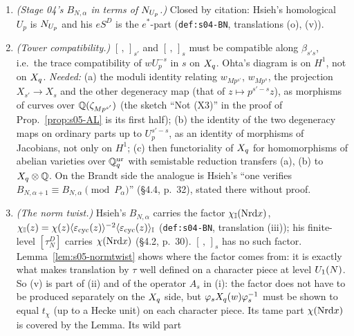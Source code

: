 \begin{remark}
\begin{enumerate}[label=(\roman*)]
  diamonds acting through $\Lam$ (\texttt{def:s04-BN}, translation (i)). On our side this needs $p\nmid\varphi(M)$ (or a coarser decomposition) and
  a comparison of $\varprojlim_sE_s$ with Hsieh's $eS^D(N,\chi,\mathbb I)$ through $\Phi$ and the $\iota_2$-duality of Remark~.
\item \emph{(Stage 04's $B_{N,\alpha}$ in terms of $N_{U_p}$.)} Closed by citation: Hsieh's homological $U_p$ is $N_{U_p}$ and his $eS^D$ is the $e^*$-part
  (\texttt{def:s04-BN}, translations (o), (v)).
\item \emph{(Tower compatibility.)} $[\,,\,]_{s'}$ and $[\,,\,]_s$ must be compatible along $\beta_{s's}$, i.e.\ the trace compatibility of $wU_p^{-s}$ in $s$ on $X_q$.
  Ohta's diagram  is on $H^1$, not on $X_q$. \emph{Needed:}
  (a) the moduli identity relating $w_{Mp^{s'}}$, $w_{Mp^s}$, the projection $X_{s'}\to X_s$ and the other degeneracy map (that of $z\mapsto p^{s'-s}z$), as morphisms of
  curves over $\mathbb{Q}(\zeta_{Mp^{s'}})$ (the sketch ``Not (X3)'' in the proof of Prop.~\ref{prop:s05-AL} is its first half); (b) the identity of the two degeneracy maps on
  ordinary parts up to $U_p^{s'-s}$, as an identity of morphisms of Jacobians, not only on $H^1$; (c) then functoriality of $X_q$ for homomorphisms of abelian varieties over
  $\mathbb{Q}_q^{\rm ur}$ with semistable reduction transfers (a), (b) to $X_q\otimes\mathbb{Q}$. On the Brandt side the analogue is Hsieh's ``one verifies
  $B_{N,\alpha+1}\equiv B_{N,\alpha}\pmod{P_\alpha}$'' (\S4.4, p.~32), stated there without proof.
\item \emph{(The norm twist.)} Hsieh's $B_{N,\alpha}$ carries the factor $\chi_{\mathbb I}(\mathrm{Nrd} x)$,
  $\chi_{\mathbb I}(z)=\chi(z)\langle\varepsilon_{\rm cyc}(z)\rangle^{-2}\langle\varepsilon_{\rm cyc}(z)\rangle_{\mathbb I}$
  (\texttt{def:s04-BN}, translation (iii)); his finite-level $[\tau^D_N]$ carries $\chi(\mathrm{Nrd} x)$ (\S4.2, p.~30). $[\,,\,]_s$ has no such factor.
  Lemma~\ref{lem:s05-normtwist} shows where the factor comes from: it is exactly what makes translation by $\tau$ well defined on a character piece at level
  $U_1(N)$. So (v) is part of (ii) and of the operator $A_s$ in (i): the factor does not have to be produced separately on the $X_q$ side, but $\varphi_sX_q(w)\varphi_s^{-1}$
  must be shown to equal $t_\chi$ (up to a Hecke unit) on each character piece. Its tame part $\chi(\mathrm{Nrd} x)$ is covered by the Lemma. Its wild part

\end{enumerate}
\end{remark}
